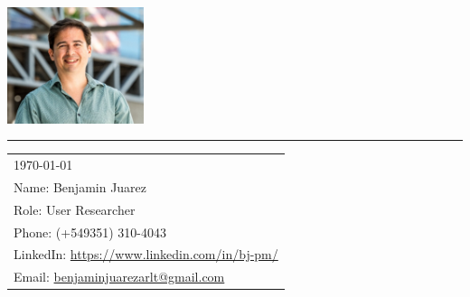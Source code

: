 
\includegraphics[width=0.3\textwidth]{pic.png} %

\vspace{-1em} %

\rule{\linewidth}{1pt} %

\bigskip\bigskip %


\hfill
\begin{tabular}{l @{}}
	\today \midskip\\ %
	Name: Benjamin Juarez \\
	Role: User Researcher \\
	Phone: (+549351) 310-4043 \\
	LinkedIn: \href{https://www.linkedin.com/in/bj-pm/?locale=en_US}{https://www.linkedin.com/in/bj-pm/} \\
	Email: \href{benjaminjuarezarlt@gmail.com}{benjaminjuarezarlt@gmail.com} \\
\end{tabular}

\midskip 

